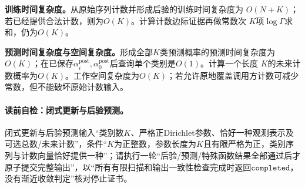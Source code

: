 \label{struct:V5-C05-CH26}
\textbf{训练时间复杂度。}从原始序列计数并形成后验的训练时间复杂度为
$O(N+K)$；若已经提供合法计数，则为$O(K)$。计算计数边际证据再做常数次
$K$项$\log\Gamma$求和，仍为$O(K)$。

\label{struct:V5-C05-CH27}
\textbf{预测时间复杂度与空间复杂度。}形成全部$K$类预测概率的预测时间复杂度为
$O(K)$；在已保存$\alpha_i^{\mathrm{post}},\alpha_0^{\mathrm{post}}$后查询单个类别是$O(1)$。计算一个长度
$K$的未来计数概率为$O(K)$。工作空间复杂度为$O(K)$；若允许原地覆盖调用方计数可减少常数，但不能破坏原始计数输入。

\begingroup
\SetAlgoLined
\paragraph{读前自检：闭式更新与后验预测。}闭式更新与后验预测输入“类别数$K$、严格正Dirichlet参数、恰好一种观测表示及可选总数/未来计数”，条件“$K$为正整数，参数长度为$K$且有限严格为正，类别序列与计数向量恰好提供一种”；请执行一轮“后验/预测/特殊函数结果全部通过后才原子提交完整输出”，以“所有有限扫描和输出一致性检查完成时返回$\mathtt{completed}$，没有渐近收敛判定”核对停止证书。\par

